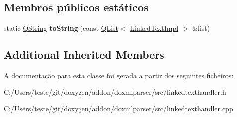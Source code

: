 \subsection*{Membros públicos estáticos}
\begin{DoxyCompactItemize}
\item 
\hypertarget{class_linked_text_handler_afd1d867900cda2d0deac9884cb5f8c19}{static \hyperlink{class_q_string}{Q\-String} {\bfseries to\-String} (const \hyperlink{class_q_list}{Q\-List}$<$ \hyperlink{class_linked_text_impl}{Linked\-Text\-Impl} $>$ \&list)}\label{class_linked_text_handler_afd1d867900cda2d0deac9884cb5f8c19}

\end{DoxyCompactItemize}
\subsection*{Additional Inherited Members}


A documentação para esta classe foi gerada a partir dos seguintes ficheiros\-:\begin{DoxyCompactItemize}
\item 
C\-:/\-Users/teste/git/doxygen/addon/doxmlparser/src/linkedtexthandler.\-h\item 
C\-:/\-Users/teste/git/doxygen/addon/doxmlparser/src/linkedtexthandler.\-cpp\end{DoxyCompactItemize}
